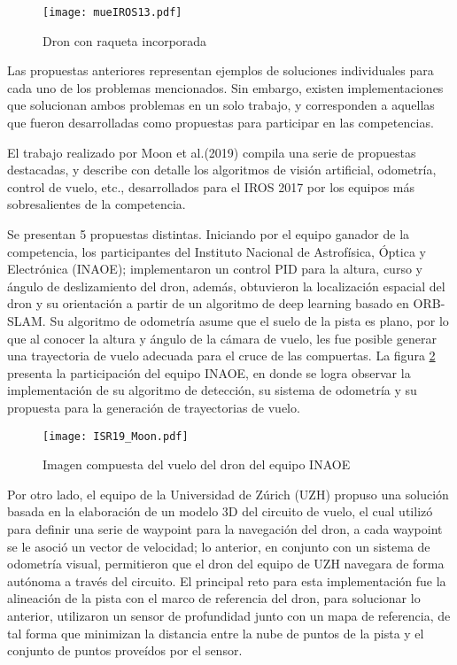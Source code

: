 \begin{figure}[ht]
    \centering
    \texttt{[image: mueIROS13.pdf]}
    \caption{Dron con raqueta incorporada \citet{mueller2013computationally}}
    \label{fig:mueIROS13}
\end{figure}

Las propuestas anteriores representan ejemplos de soluciones individuales para cada uno de los problemas mencionados. Sin embargo, existen implementaciones que solucionan ambos problemas en un solo trabajo, y corresponden a aquellas que fueron desarrolladas como propuestas para participar en las competencias.

El trabajo realizado por Moon et al.(2019) \citet{moon2019challenges} compila una serie de propuestas destacadas, y describe con detalle los algoritmos de visión artificial, odometría, control de vuelo, etc., desarrollados para el IROS 2017 por los equipos más sobresalientes de la competencia. 

Se presentan 5 propuestas distintas. Iniciando por el equipo ganador de la competencia, los participantes del Instituto Nacional de Astrofísica, Óptica y Electrónica (INAOE); implementaron un control PID para la altura, curso y ángulo de deslizamiento del dron, además, obtuvieron la localización espacial del dron y su orientación a partir de un algoritmo de  deep learning basado en ORB-SLAM. Su algoritmo de odometría asume que el suelo de la pista es plano, por lo que al conocer la altura y ángulo de la cámara de vuelo, les fue posible generar una trayectoria de vuelo adecuada para el cruce de las compuertas. La figura \ref{fig:ISR19_Moon} presenta la participación del equipo INAOE, en donde se logra observar la implementación de su algoritmo de detección, su sistema de odometría y su propuesta para la generación de trayectorias de vuelo.

\begin{figure}[ht]
    \centering
    \texttt{[image: ISR19\_Moon.pdf]}
    \caption{Imagen compuesta del vuelo del dron del equipo INAOE\citet{moon2019challenges}}
    \label{fig:ISR19_Moon}
\end{figure}


Por otro lado, el equipo de la Universidad de Zúrich (UZH) propuso una solución basada en la elaboración de un modelo 3D del circuito de vuelo, el cual utilizó para definir una serie de waypoint para la navegación del dron, a cada waypoint se le asoció un vector de velocidad; lo anterior, en conjunto con un sistema de odometría visual, permitieron que el dron del equipo de UZH navegara de forma autónoma a través del circuito. 
El principal reto para esta implementación fue la alineación de la pista con el marco de referencia del dron, para solucionar lo anterior, utilizaron  un sensor de profundidad junto con un mapa de referencia, de tal forma que minimizan la distancia entre la nube de puntos de la pista y el conjunto de puntos proveídos por el sensor.

